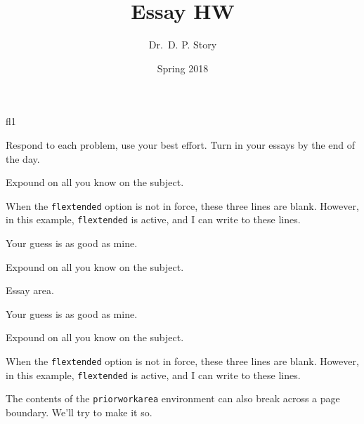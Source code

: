 \documentclass{article}
\title[HW]{Essay HW}
\author{Dr.\ D. P. Story}
\date{Spring 2018}
\let\opt\texttt
\let\env\texttt
\begin{document}
\maketitle

\begin{exam}{fl1}

\begin{instructions}[]
Respond to each problem, use your best effort. Turn in your essays by the end of the day.
\end{instructions}

%

\begin{problem}
Expound on all you know on the subject.
\begin{priorworkarea}
When the \opt{flextended} option is not in force, these three lines are blank. However, in this example,
\opt{flextended} is active, and I can write to these lines. 
\end{priorworkarea}
\begin{solution}[nLines=3]
Your guess is as good as mine. 
\end{solution}
\end{problem}


\begin{problem}
Expound on all you know on the subject.
\begin{priorworkarea}
Essay area.
\end{priorworkarea}
\begin{solution}[42pt]
Your guess is as good as mine.
\end{solution}
\end{problem}

\vspace{2.1in}
\vspace{2.1in}

\begin{problem}
Expound on all you know on the subject.
\begin{priorworkarea}
When the \opt{flextended} option is not in force, these three lines are
blank. However, in this example, \opt{flextended} is active, and I can write
to these lines.

The contents of the \env{priorworkarea} environment can also break across a
page boundary. We'll try to make it so.\vspace{2\baselineskip}


\end{priorworkarea}
\end{problem}
\end{exam}
\end{document}
